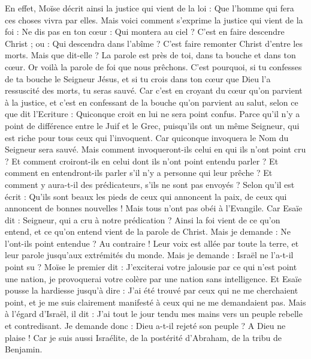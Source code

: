 \begin{multicols}{2}
En effet, Moïse décrit ainsi la justice qui vient de la loi : Que l'homme qui fera ces choses vivra par elles.
Mais voici comment s'exprime la justice qui vient de la foi : Ne dis pas en ton cœur : Qui montera au ciel ? C'est en faire descendre Christ ;
ou : Qui descendra dans l'abîme ? C'est faire remonter Christ d'entre les morts.
Mais que dit-elle ? La parole est près de toi, dans ta bouche et dans ton cœur. Or voilà la parole de foi que nous prêchons.
C'est pourquoi, si tu confesses de ta bouche le Seigneur Jésus, et si tu crois dans ton cœur que Dieu l'a ressuscité des morts, tu seras sauvé.
Car c'est en croyant du cœur qu'on parvient à la justice, et c'est en confessant de la bouche qu'on parvient au salut, selon ce que dit l'Ecriture :
Quiconque croit en lui ne sera point confus.
Parce qu'il n'y a point de différence entre le Juif et le Grec, puisqu'ils ont un même Seigneur, qui est riche pour tous ceux qui l'invoquent.
Car quiconque invoquera le Nom du Seigneur sera sauvé.
Mais comment invoqueront-ils celui en qui ils n'ont point cru ? Et comment croiront-ils en celui dont ils n'ont point entendu parler ? Et comment en entendront-ils parler s'il n'y a personne qui leur prêche ?
Et comment y aura-t-il des prédicateurs, s'ils ne sont pas envoyés ? Selon qu'il est écrit : Qu'ils sont beaux les pieds de ceux qui annoncent la paix, de ceux qui annoncent de bonnes nouvelles !
Mais tous n'ont pas obéi à l'Evangile. Car Esaïe dit : Seigneur, qui a cru à notre prédication ?
Ainsi la foi vient de ce qu'on entend, et ce qu'on entend vient de la parole de Christ.
Mais je demande : Ne l'ont-ils point entendue ? Au contraire ! Leur voix est allée par toute la terre, et leur parole jusqu'aux extrémités du monde.
Mais je demande : Israël ne l'a-t-il point su ? Moïse le premier dit : J'exciterai votre jalousie par ce qui n'est point une nation, je provoquerai votre colère par une nation sans intelligence.
Et Esaïe pousse la hardiesse jusqu'à dire : J'ai été trouvé par ceux qui ne me cherchaient point, et je me suis clairement manifesté à ceux qui ne me demandaient pas.
Mais à l'égard d'Israël, il dit : J'ai tout le jour tendu mes mains vers un peuple rebelle et contredisant.
\VerseOne{}Je demande donc : Dieu a-t-il rejeté son peuple ? A Dieu ne plaise ! Car je suis aussi Israélite, de la postérité d'Abraham, de la tribu de Benjamin.

\end{multicols}
